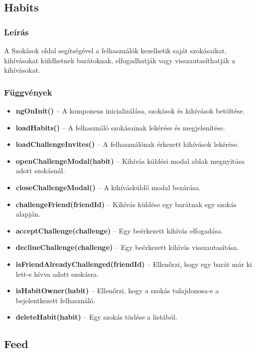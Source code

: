 \documentclass[12pt]{report}
\begin{document}
\subsection{Habits}

\subsubsection{Leírás}
A Szokások oldal segítségével a felhasználók kezelhetik saját szokásaikat, kihívásokat küldhetnek barátoknak, elfogadhatják vagy visszautasíthatják a kihívásokat.

\subsubsection{Függvények}

\begin{itemize}
  \item \textbf{ngOnInit()} -- A komponens inicializálása, szokások és kihívások betöltése.
  \item \textbf{loadHabits()} -- A felhasználó szokásainak lekérése és megjelenítése.
  \item \textbf{loadChallengeInvites()} -- A felhasználónak érkezett kihívások lekérése.
  \item \textbf{openChallengeModal(habit)} -- Kihívás küldési modal ablak megnyitása adott szokásnál.
  \item \textbf{closeChallengeModal()} -- A kihívásküldő modal bezárása.
  \item \textbf{challengeFriend(friendId)} -- Kihívás küldése egy barátnak egy szokás alapján.
  \item \textbf{acceptChallenge(challenge)} -- Egy beérkezett kihívás elfogadása.
  \item \textbf{declineChallenge(challenge)} -- Egy beérkezett kihívás visszautasítása.
  \item \textbf{isFriendAlreadyChallenged(friendId)} -- Ellenőrzi, hogy egy barát már ki lett-e hívva adott szokásra.
  \item \textbf{isHabitOwner(habit)} -- Ellenőrzi, hogy a szokás tulajdonosa-e a bejelentkezett felhasználó.
  \item \textbf{deleteHabit(habit)} -- Egy szokás törlése a listából.
\end{itemize}

\subsection{Feed}
\end{document}
